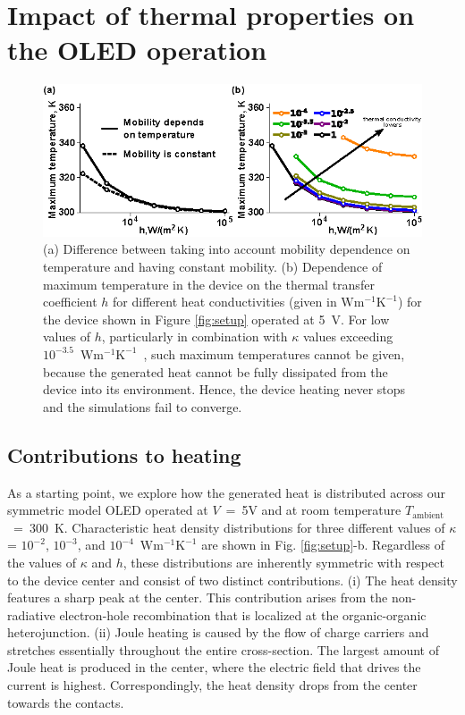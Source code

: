 \documentclass[%
9pt,
 aip,
rsi,%
 amsmath,amssymb,
preprint,%
]{revtex4-1}
\newcommand{\thermalconductivity}{$\mathrm{W m^{-1} K^{-1}}$}
\newcommand{\hcoefficient}{$\mathrm{W m^{-2} K^{-1}}$}
\begin{document}
\section{Impact of thermal properties on the OLED operation}

\begin{figure}
	\centering
    \includegraphics{Fig_3.eps} 
    \caption{(a) Difference between taking into account mobility dependence on temperature and having constant mobility. (b) Dependence of maximum temperature in the device on the thermal transfer coefficient $h$ for different heat conductivities (given in \thermalconductivity) for the device shown in Figure \ref{fig:setup} operated at 5~V. 
    For low values of $h$, particularly in combination with $\kappa$ values exceeding $10^{-3.5}$~\thermalconductivity~, such maximum temperatures cannot be given, because the generated heat cannot be fully dissipated from the device into its environment. Hence, the device heating never stops and the simulations fail to converge.}
\label{fig:I-Vandh-k-maxT}
\end{figure}

\subsection{Contributions to heating}
As a starting point, we explore how the generated heat is distributed across our symmetric model OLED operated at $V$~=~5V and at room temperature $T_{\mathrm{ambient}}$~=~300~K. 
Characteristic heat density distributions for three different values of $\kappa$ = $10^{-2}$, $10^{-3}$, and $10^{-4}$~\thermalconductivity %
are shown in Fig. \ref{fig:setup}-b.
Regardless of the values of $\kappa$ and $h$, these distributions are inherently symmetric with respect to the device center and consist of two distinct contributions. 
(i) The heat density features a sharp peak at the center. 
This contribution arises from the non-radiative electron-hole recombination that is localized at the organic-organic heterojunction. 
(ii) Joule heating is caused by the flow of charge carriers and stretches essentially throughout the entire cross-section. 
The largest amount of Joule heat is produced in the center, where the electric field that drives the current is highest. 
Correspondingly, the heat density drops from the center towards the contacts. 
\end{document}
